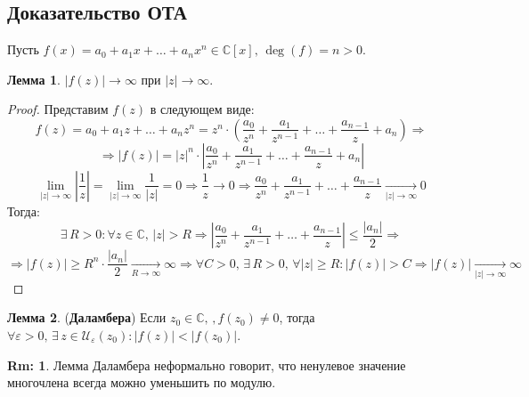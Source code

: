 \documentclass[12pt]{article}
\newcommand{\MC}{\mathbb{C}}
\newcommand{\MU}{\mathcal{U}}
\newcommand{\VE}{\varepsilon}
\theoremstyle{definition}
\newtheorem{rem}{Rm:}
\newtheorem{lemma}{Лемма}
\begin{document}
\subsection*{Доказательство ОТА}
Пусть $f(x) = a_0 + a_1x + \dotsc + a_n x^n \in \MC[x], \, \deg(f) = n > 0$.
\begin{lemma}
	$|f(z)| \to \infty$ при $|z| \to \infty$.
\end{lemma}
\begin{proof}
	Представим $f(z)$ в следующем виде:
	$$
		f(z) = a_0 + a_1z + \dotsc + a_n z^n = z^n{\cdot}\left(\dfrac{a_0}{z^n} + \dfrac{a_1}{z^{n-1}}+ \dotsc + \dfrac{a_{n-1}}{z} + a_n\right) \Rightarrow
	$$
	$$
		\Rightarrow |f(z)| = |z|^n{\cdot}\left| \dfrac{a_0}{z^n} + \dfrac{a_1}{z^{n-1}}+ \dotsc + \dfrac{a_{n-1}}{z} + a_n\right|
	$$
	$$
		\lim\limits_{|z| \to \infty}\left|\dfrac{1}{z}\right| = \lim\limits_{|z| \to \infty}\dfrac{1}{|z|} = 0 \Rightarrow \dfrac{1}{z} \to 0 \Rightarrow \dfrac{a_0}{z^n} + \dfrac{a_1}{z^{n-1}}+ \dotsc + \dfrac{a_{n-1}}{z} \xrightarrow[|z|\to \infty]{} 0
	$$
	Тогда: 
	$$
		\exists \, R > 0 \colon \forall z \in \MC, \, |z| > R \Rightarrow \left| \dfrac{a_0}{z^n} + \dfrac{a_1}{z^{n-1}}+ \dotsc + \dfrac{a_{n-1}}{z}\right| \leq \dfrac{|a_n|}{2} \Rightarrow
	$$
	$$
		\Rightarrow |f(z)| \geq R^n{\cdot}\dfrac{|a_n|}{2} \xrightarrow[R \to \infty]{} \infty \Rightarrow \forall C> 0, \, \exists\, R > 0, \, \forall |z|  \geq R \colon |f(z)| > C \Rightarrow |f(z)| \xrightarrow[|z| \to \infty]{} \infty
	$$
\end{proof}
\newpage
\begin{lemma}(\textbf{Даламбера})
	Если $z_0\in \MC, \, ,f(z_0) \neq 0$, тогда $\forall \VE > 0, \, \exists \, z \in \MU_{\VE}(z_0)\colon |f(z)| < |f(z_0)|$.
\end{lemma}
\begin{rem}
	Лемма Даламбера неформально говорит, что ненулевое значение многочлена всегда можно уменьшить по модулю.
\end{rem}
\end{document}
